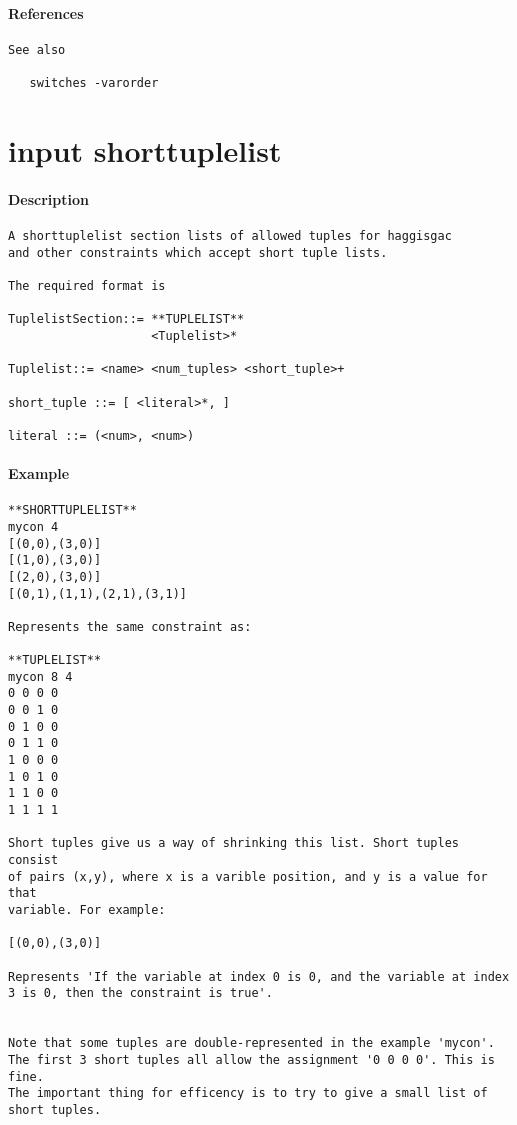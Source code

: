 \paragraph{References}
{\footnotesize
\begin{verbatim}
See also

   switches -varorder
\end{verbatim}
}
\section{input shorttuplelist}
\paragraph{Description}
{\footnotesize
\begin{verbatim}
A shorttuplelist section lists of allowed tuples for haggisgac
and other constraints which accept short tuple lists.

The required format is

TuplelistSection::= **TUPLELIST**
                    <Tuplelist>*

Tuplelist::= <name> <num_tuples> <short_tuple>+

short_tuple ::= [ <literal>*, ]

literal ::= (<num>, <num>)
\end{verbatim}
}
\paragraph{Example}
{\footnotesize
\begin{verbatim}
**SHORTTUPLELIST**
mycon 4
[(0,0),(3,0)]
[(1,0),(3,0)]
[(2,0),(3,0)]
[(0,1),(1,1),(2,1),(3,1)]

Represents the same constraint as:

**TUPLELIST**
mycon 8 4
0 0 0 0
0 0 1 0
0 1 0 0
0 1 1 0
1 0 0 0
1 0 1 0
1 1 0 0
1 1 1 1

Short tuples give us a way of shrinking this list. Short tuples consist
of pairs (x,y), where x is a varible position, and y is a value for that 
variable. For example:

[(0,0),(3,0)]

Represents 'If the variable at index 0 is 0, and the variable at index
3 is 0, then the constraint is true'.


Note that some tuples are double-represented in the example 'mycon'.
The first 3 short tuples all allow the assignment '0 0 0 0'. This is fine.
The important thing for efficency is to try to give a small list of 
short tuples.
\end{verbatim}
}
